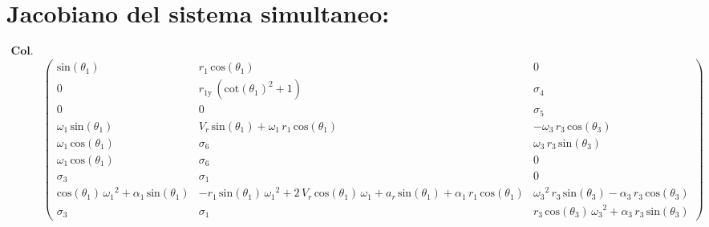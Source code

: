 \documentclass[12pt]{article}
\begin{document}
\section{Jacobiano del sistema simultaneo:}\label{JAC9}
\small
\begin{turn}{90}
\begin{equation*}
\begin{array}{cc}
\mathrm{\textbf{Col. 1-3:}}&\\
&\left(\begin{array}{cccc}
\mathrm{sin}\left(\theta_1 \right) & r_1 \,\mathrm{cos}\left(\theta_1 \right) & 0 \\
0 & r_{\textrm{1y}} \,{\left({\mathrm{cot}\left(\theta_1 \right)}^2 +1\right)} & \sigma_4 \\
0 & 0 & \sigma_5 \\
\omega_1 \,\mathrm{sin}\left(\theta_1 \right) & V_r \,\mathrm{sin}\left(\theta_1 \right)+\omega_1 \,r_1 \,\mathrm{cos}\left(\theta_1 \right) & -\omega_3 \,r_3 \,\mathrm{cos}\left(\theta_3 \right)\\
\omega_1 \,\mathrm{cos}\left(\theta_1 \right) & \sigma_6  & \omega_3 \,r_3 \,\mathrm{sin}\left(\theta_3 \right)\\
\omega_1 \,\mathrm{cos}\left(\theta_1 \right) & \sigma_6  & 0 \\
\sigma_3  & \sigma_1  & 0 \\
\mathrm{cos}\left(\theta_1 \right)\,{\omega_1 }^2 +\alpha_1 \,\mathrm{sin}\left(\theta_1 \right) & -r_1 \,\mathrm{sin}\left(\theta_1 \right)\,{\omega_1 }^2 +2\,V_r \,\mathrm{cos}\left(\theta_1 \right)\,\omega_1 +a_r \,\mathrm{sin}\left(\theta_1 \right)+\alpha_1 \,r_1 \,\mathrm{cos}\left(\theta_1 \right) & {\omega_3 }^2 \,r_3 \,\mathrm{sin}\left(\theta_3 \right)-\alpha_3 \,r_3 \,\mathrm{cos}\left(\theta_3 \right) \\
\sigma_3  & \sigma_1  & r_3 \,\mathrm{cos}\left(\theta_3 \right)\,{\omega_3 }^2 +\alpha_3 \,r_3 \,\mathrm{sin}\left(\theta_3 \right) 
\end{array}\right)
\end{array}
\end{equation*}
\end{turn}
\end{document}
